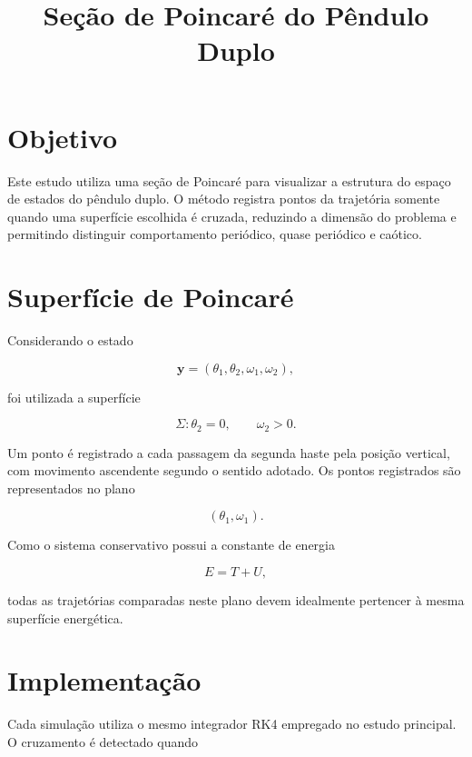 \documentclass[12pt,a4paper]{article}
\title{Seção de Poincaré do Pêndulo Duplo}
\author{}
\date{}
\begin{document}
\maketitle

\section{Objetivo}

Este estudo utiliza uma seção de Poincaré para visualizar a estrutura do espaço de estados do pêndulo duplo. O método registra pontos da trajetória somente quando uma superfície escolhida é cruzada, reduzindo a dimensão do problema e permitindo distinguir comportamento periódico, quase periódico e caótico.

\section{Superfície de Poincaré}

Considerando o estado

\begin{equation}
\mathbf{y}=(\theta_1,\theta_2,\omega_1,\omega_2),
\end{equation}

foi utilizada a superfície

\begin{equation}
\Sigma:\theta_2=0,
\qquad
\omega_2>0.
\end{equation}

Um ponto é registrado a cada passagem da segunda haste pela posição vertical, com movimento ascendente segundo o sentido adotado. Os pontos registrados são representados no plano

\begin{equation}
(\theta_1,\omega_1).
\end{equation}

Como o sistema conservativo possui a constante de energia

\begin{equation}
E=T+U,
\end{equation}

todas as trajetórias comparadas neste plano devem idealmente pertencer à mesma superfície energética.

\section{Implementação}

Cada simulação utiliza o mesmo integrador RK4 empregado no estudo principal. O cruzamento é detectado quando
\end{document}
